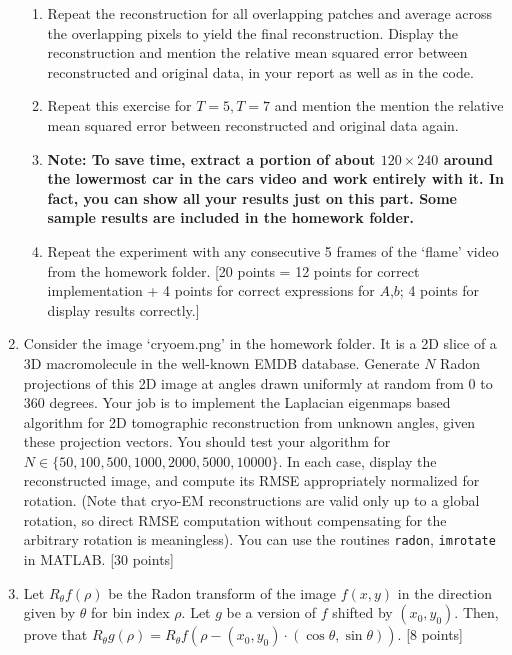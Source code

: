 \documentclass[11pt]{article}
\begin{document}
\begin{enumerate}
\begin{enumerate}
\item Repeat the reconstruction for all overlapping patches and average across the overlapping pixels to yield the final reconstruction. Display the reconstruction and mention the relative mean squared error between reconstructed and original data, in your report as well as in the code. 
\item Repeat this exercise for $T = 5, T = 7$ and mention the mention the relative mean squared error between reconstructed and original data again.
\item \textbf{Note: To save time, extract a portion of about $120 \times 240$ around the lowermost car in the cars video and work entirely with it. In fact, you can show all your results just on this part. Some sample results are included in the homework folder.}
\item Repeat the experiment with any consecutive 5 frames of the `flame' video from the homework folder. 
\textsf{[20 points = 12 points for correct implementation + 4 points for correct expressions for $A$,$b$; 4 points for display results correctly.]}
\end{enumerate}

\item Consider the image `cryoem.png' in the homework folder. It is a 2D slice of a 3D macromolecule in the well-known EMDB database. Generate $N$ Radon projections of this 2D image at angles drawn uniformly at random from $0$ to $360$ degrees. Your job is to implement the Laplacian eigenmaps based algorithm for 2D tomographic reconstruction from unknown angles, given these projection vectors. You should test your algorithm for $N \in \{50,100,500,1000,2000,5000,10000\}$. In each case, display the reconstructed image, and compute its RMSE appropriately normalized for rotation. (Note that cryo-EM reconstructions are valid only up to a global rotation, so direct RMSE computation without compensating for the arbitrary rotation is meaningless). You can use the routines \texttt{radon}, \texttt{imrotate} in MATLAB. \textsf{[30 points]}  

\item Let $R_{\theta}f(\rho)$ be the Radon transform of the image $f(x,y)$ in the direction given by $\theta$ for bin index $\rho$. Let $g$ be a version of $f$ shifted by $(x_0,y_0)$. Then, prove that $R_{\theta}g(\rho) = R_{\theta}f(\rho - (x_0,y_0) \cdot (\cos \theta, \sin \theta))$. \textsf{[8 points]}


\end{enumerate}
\end{document}
